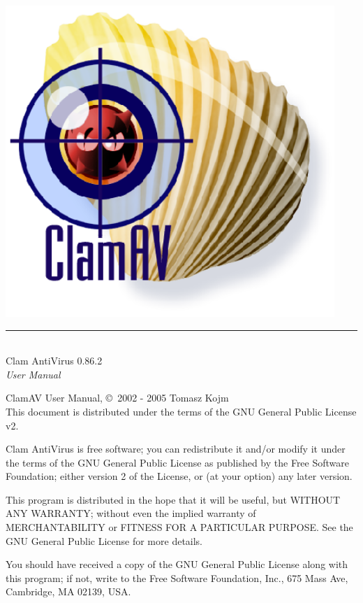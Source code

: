 \documentclass[a4paper,titlepage,12pt]{article}
\date{}
\begin{document}
    \setcounter{page}{0}

    \pagestyle{empty}
    \includegraphics[width=353pt]{clam.eps}
    \vspace{3cm}
    \begin{flushright}
	\rule[-1ex]{8cm}{3pt}\\
	\huge Clam AntiVirus 0.86.2\\
	\huge \emph{User Manual}\\
    \end{flushright}

    \newpage
    \pagestyle{fancy}
    \tableofcontents
    \vspace{11.5cm}

    \noindent
    \begin{boxedminipage}[b]{\textwidth}
    ClamAV User Manual, \copyright \  2002 - 2005 Tomasz Kojm\\
    This document is distributed under the terms of the GNU General
    Public License v2.
    \end{boxedminipage}

    \vspace{1.0cm}

    \noindent
    \begin{boxedminipage}[b]{\textwidth}
    Clam AntiVirus is free software; you can redistribute it and/or modify
    it under the terms of the GNU General Public License as published by
    the Free Software Foundation; either version 2 of the License, or
    (at your option) any later version.

    This program is distributed in the hope that it will be useful,
    but WITHOUT ANY WARRANTY; without even the implied warranty of
    MERCHANTABILITY or FITNESS FOR A PARTICULAR PURPOSE.  See the
    GNU General Public License for more details.

    You should have received a copy of the GNU General Public License
    along with this program; if not, write to the Free Software
    Foundation, Inc., 675 Mass Ave, Cambridge, MA 02139, USA.
    \end{boxedminipage}
\end{document}
